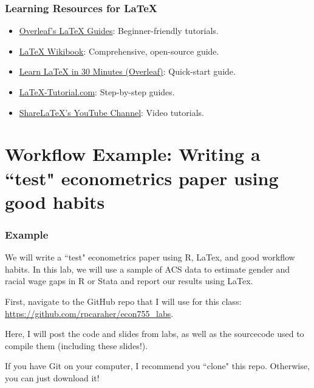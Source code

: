\documentclass{beamer}
\begin{document}
    \begin{frame}
        \frametitle{Learning Resources for \LaTeX{}}

    \begin{itemize}
        \item \href{https://www.overleaf.com/learn/latex}{Overleaf's \LaTeX{} Guides}: Beginner-friendly tutorials.
        \item \href{https://en.wikibooks.org/wiki/LaTeX}{\LaTeX{} Wikibook}: Comprehensive, open-source guide.
        \item \href{https://www.overleaf.com/learn/latex/Learn_LaTeX_in_30_minutes}{Learn \LaTeX{} in 30 Minutes (Overleaf)}: Quick-start guide.
        \item \href{https://www.latex-tutorial.com/}{LaTeX-Tutorial.com}: Step-by-step guides.
        \item \href{https://www.youtube.com/user/ShareLaTeX/videos}{ShareLaTeX's YouTube Channel}: Video tutorials.
    \end{itemize}
    \end{frame}


\section{Workflow Example: Writing a ``test" econometrics paper using good habits}
\label{sec:activity}

\begin{frame}
    \frametitle{Example}

We will write a ``test" econometrics paper using R, LaTex, and good workflow habits.
In this lab, we will use a sample of ACS data to estimate gender and racial wage gaps in R or Stata and report our results using LaTex.

\vspace{10pt}

First, navigate to the GitHub repo that I will use for this class: \url{https://github.com/rpcaraher/econ755_labs}.

\vspace{10pt}

Here, I will post the code and slides from labs, as well as the sourcecode used to compile them (including these slides!).

\vspace{10pt}

If you have Git on your computer, I recommend you ``clone" this repo. Otherwise, you can just download it!

\end{frame}

\end{document}
